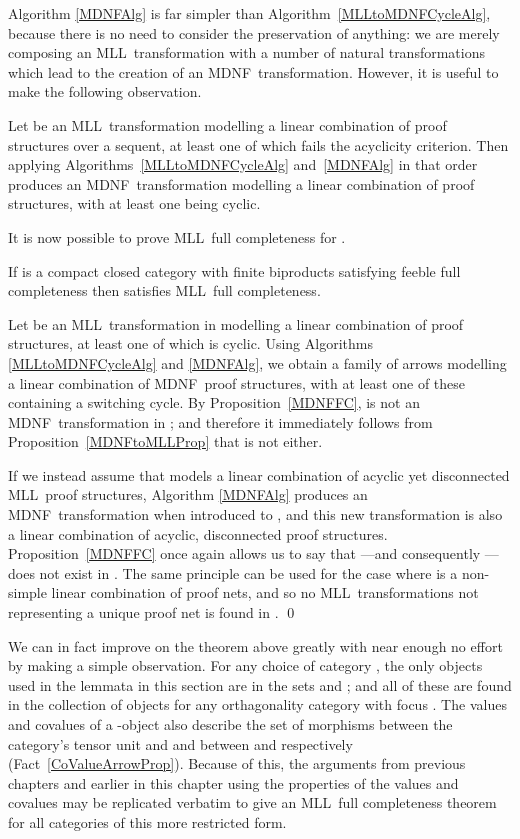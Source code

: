 \documentclass{LMCS}
\theoremstyle{plain}\newtheorem*{cLm}{Claim}
\newcommand{\mll}{MLL} \newcommand{\mall}{MALL}
\newcommand{\p}{} \newcommand{\N}{\mathbb{N}}
\newcommand{\hughf}[1]{#1}
\begin{document}
\noindent    Algorithm \ref{MDNFAlg} is far simpler than Algorithm~\ref{MLLtoMDNFCycleAlg}, because there is no need to consider the preservation of anything: we are merely composing an \mll~transformation with a number of natural transformations which lead to the creation of an MDNF~transformation. However, it is useful to make the following observation.
    
    \begin{obs}
    Let  be an \mll~transformation modelling a linear combination of proof structures over a sequent, at least one of which fails the acyclicity criterion. Then applying Algorithms~\ref{MLLtoMDNFCycleAlg} and~\ref{MDNFAlg} in that order produces an MDNF~transformation  modelling a linear combination of proof structures, with at least one being cyclic.
    \end{obs}
    
    It is now possible to prove \mll~full completeness for .
    
    \begin{thm}\label{fcomp}
      If\/  is a compact closed category with finite biproducts
      satisfying feeble full completeness then\/  satisfies \mll~full completeness.
    \end{thm}
    \proof
      Let  be an \mll~transformation in  modelling a linear
      combination of proof structures, at least one of which is cyclic.
      Using Algorithms \ref{MLLtoMDNFCycleAlg} and \ref{MDNFAlg}, we obtain a family of arrows  modelling a linear combination of MDNF~proof
      structures, with at least one of these containing a switching
      cycle. By Proposition~\ref{MDNFFC},  is not an
      MDNF~transformation in ; and therefore it immediately follows
     from Proposition~\ref{MDNFtoMLLProp} that  is not either.
    
      \p If we instead assume that  models a linear combination of acyclic yet disconnected \mll~proof structures, Algorithm \ref{MDNFAlg} produces an MDNF~transformation  when introduced to , and this new transformation is also a linear combination of \hughf{acyclic, disconnected} proof structures. Proposition~\ref{MDNFFC} once again allows us to say that ---and consequently ---does not exist in . The same principle can be used for the case where  is a non-simple linear combination of proof nets, and so no \mll~transformations not representing a unique proof net is found in . \qed
    
    We can in fact improve on the theorem above greatly with near enough no effort by making a simple observation. For any choice of category , the only objects used in the lemmata in this section are in the sets  and ; and all of these are found in the collection of objects for any orthagonality category  with focus . The values and covalues of a -object  also describe the set of morphisms between the category's tensor unit  and  and between  and  respectively (Fact~\ref{CoValueArrowProp}). Because of this, the arguments from previous chapters and earlier in this chapter using the properties of the values and covalues may be replicated verbatim to give an \mll~full completeness theorem for all categories of this more restricted form.
    
\end{document}
